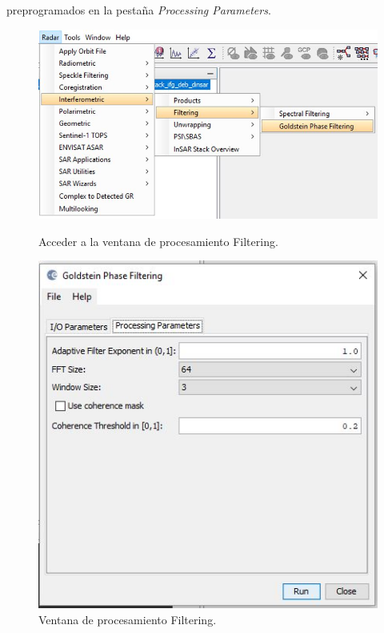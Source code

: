 \documentclass{article}
\begin{document}
preprogramados en la pestaña \textit{Processing Parameters}.
\begin{figure}[htbp]
\begin{minipage}[b]{0.5\linewidth}
\centering
\includegraphics[width=\linewidth]{Imagen/13.JPG}
\caption{Acceder a la ventana de procesamiento Filtering.}
\label{fig:figura13}
\end{minipage}
\hspace{0.5cm}
\begin{minipage}[b]{0.5\linewidth}
\centering
\includegraphics[width=\linewidth]{Imagen/14.JPG}
\caption{Ventana de procesamiento Filtering.}
\label{fig:figura14}
\end{minipage}
\end{figure}
\end{document}
